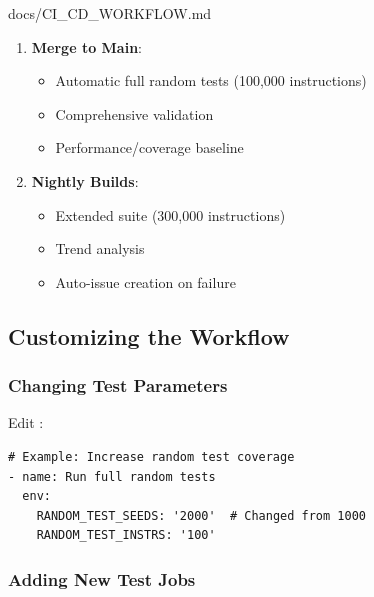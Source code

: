 \begin{relocated}{docs/CI_CD_WORKFLOW.md}
\begin{enumerate}
  \begin{itemize}
  \tightlist
  \item
    Automatic smoke tests (4,500 instructions)
  \item
    PR comment with results
  \item
    Blocks merge if tests fail
  \end{itemize}
\item
  \textbf{Merge to Main}:

  \begin{itemize}
  \tightlist
  \item
    Automatic full random tests (100,000 instructions)
  \item
    Comprehensive validation
  \item
    Performance/\allowbreak{}coverage baseline
  \end{itemize}
\item
  \textbf{Nightly Builds}:

  \begin{itemize}
  \tightlist
  \item
    Extended suite (300,000 instructions)
  \item
    Trend analysis
  \item
    Auto-issue creation on failure
  \end{itemize}
\end{enumerate}

\subsection{Customizing the Workflow}\label{um:flow:ci-cd-workflow:customizing-the-workflow}

\subsubsection{Changing Test Parameters}\label{um:flow:ci-cd-workflow:changing-test-parameters}

Edit :

\begin{lstlisting}[language={}]
# Example: Increase random test coverage
- name: Run full random tests
  env:
    RANDOM_TEST_SEEDS: '2000'  # Changed from 1000
    RANDOM_TEST_INSTRS: '100'
\end{lstlisting}

\subsubsection{Adding New Test Jobs}\label{um:flow:ci-cd-workflow:adding-new-test-jobs}


\end{relocated}

